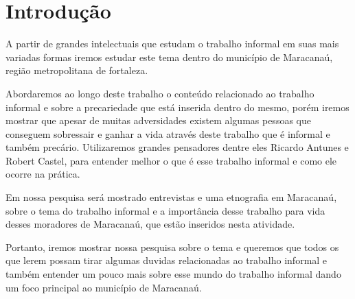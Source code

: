 \chapter{Introdução}


A partir de grandes intelectuais que estudam o trabalho informal em suas mais variadas formas iremos estudar 
este tema dentro do município de Maracanaú, região metropolitana de fortaleza.

Abordaremos ao longo deste trabalho o conteúdo relacionado ao trabalho informal e sobre a precariedade que 
está inserida dentro do mesmo, porém iremos mostrar que apesar de muitas adversidades existem algumas pessoas 
que conseguem sobressair e ganhar a vida através deste trabalho que é informal e também precário. Utilizaremos 
grandes pensadores dentre eles Ricardo Antunes e Robert Castel, para entender melhor o que é esse trabalho 
informal e como ele ocorre na prática.

Em nossa pesquisa será mostrado entrevistas e uma etnografia em Maracanaú, sobre o tema do trabalho informal 
e a importância desse trabalho para vida desses moradores de Maracanaú, que estão inseridos nesta atividade.

Portanto, iremos mostrar nossa pesquisa sobre o tema e queremos que todos os que lerem possam tirar algumas 
duvidas relacionadas ao trabalho informal e também entender um pouco mais sobre esse mundo do trabalho informal 
dando um foco principal ao município de Maracanaú. 
